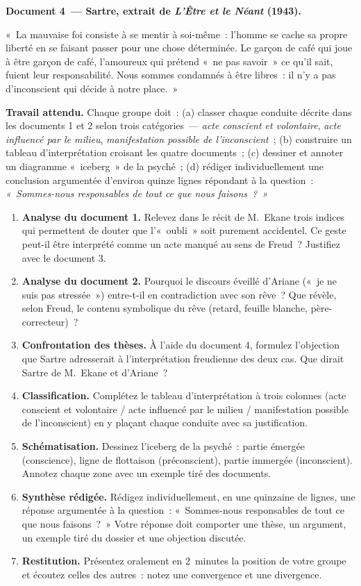 \documentclass[11pt]{article}
\newcounter{popsec}
\newcounter{popsub}
\newcommand{\courssub}[1]{%
  \stepcounter{popsub}%
  \par\vspace{9pt}\noindent{\popxbold\fontsize{11.5}{13}\selectfont\color{popink}{\color{poporange}\thepopsec.\thepopsub}\hspace{6pt}#1}\par\nopagebreak\vspace{4pt}
}
\begin{document}
\textbf{Document 4~— Sartre, extrait de \emph{L'Être et le Néant} (1943).}\par
«~La mauvaise foi consiste à se mentir à soi-même~: l'homme se cache sa propre liberté en se faisant passer pour une chose déterminée. Le garçon de café qui joue à être garçon de café, l'amoureux qui prétend «~ne pas savoir~» ce qu'il sait, fuient leur responsabilité. Nous sommes condamnés à être libres~: il n'y a pas d'inconscient qui décide à notre place.~»

\textbf{Travail attendu.} Chaque groupe doit~: (a) classer chaque conduite décrite dans les documents 1 et 2 selon trois catégories~— \emph{acte conscient et volontaire}, \emph{acte influencé par le milieu}, \emph{manifestation possible de l'inconscient}~; (b) construire un tableau d'interprétation croisant les quatre documents~; (c) dessiner et annoter un diagramme «~iceberg~» de la psyché~; (d) rédiger individuellement une conclusion argumentée d'environ quinze lignes répondant à la question~: \emph{«~Sommes-nous responsables de tout ce que nous faisons~?~»}

\courssub{Consignes}

\begin{enumerate}
\item \textbf{Analyse du document 1.} Relevez dans le récit de M.~Ekane trois indices qui permettent de douter que l'«~oubli~» soit purement accidentel. Ce geste peut-il être interprété comme un acte manqué au sens de Freud~? Justifiez avec le document 3.
\item \textbf{Analyse du document 2.} Pourquoi le discours éveillé d'Ariane («~je ne suis pas stressée~») entre-t-il en contradiction avec son rêve~? Que révèle, selon Freud, le contenu symbolique du rêve (retard, feuille blanche, père-correcteur)~?
\item \textbf{Confrontation des thèses.} À l'aide du document 4, formulez l'objection que Sartre adresserait à l'interprétation freudienne des deux cas. Que dirait Sartre de M.~Ekane et d'Ariane~?
\item \textbf{Classification.} Complétez le tableau d'interprétation à trois colonnes (acte conscient et volontaire / acte influencé par le milieu / manifestation possible de l'inconscient) en y plaçant chaque conduite avec sa justification.
\item \textbf{Schématisation.} Dessinez l'iceberg de la psyché~: partie émergée (conscience), ligne de flottaison (préconscient), partie immergée (inconscient). Annotez chaque zone avec un exemple tiré des documents.
\item \textbf{Synthèse rédigée.} Rédigez individuellement, en une quinzaine de lignes, une réponse argumentée à la question~: «~Sommes-nous responsables de tout ce que nous faisons~?~» Votre réponse doit comporter une thèse, un argument, un exemple tiré du dossier et une objection discutée.
\item \textbf{Restitution.} Présentez oralement en 2~minutes la position de votre groupe et écoutez celles des autres~: notez une convergence et une divergence.
\end{enumerate}
\end{document}
